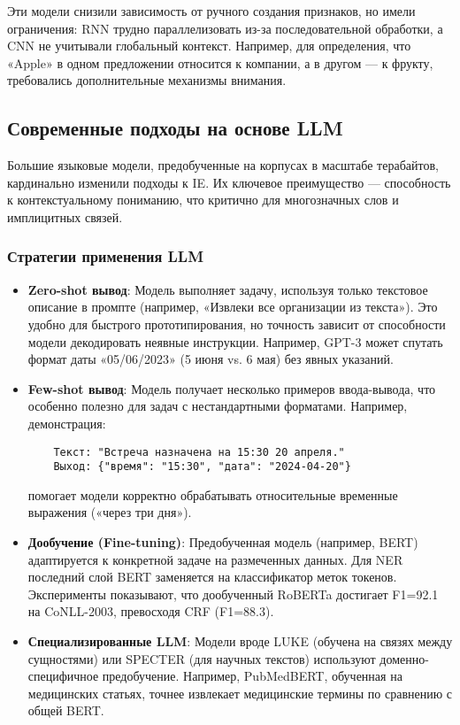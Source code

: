 Эти модели снизили зависимость от ручного создания признаков, но имели ограничения: RNN трудно параллелизовать из-за последовательной обработки, а CNN не учитывали глобальный контекст. Например, для определения, что «Apple» в одном предложении относится к компании, а в другом — к фрукту, требовались дополнительные механизмы внимания.

\subsection{Современные подходы на основе LLM}

Большие языковые модели, предобученные на корпусах в масштабе терабайтов, кардинально изменили подходы к IE. Их ключевое преимущество — способность к контекстуальному пониманию, что критично для многозначных слов и имплицитных связей.

\subsubsection{Стратегии применения LLM}

\begin{itemize}
    \item \textbf{Zero-shot вывод}: Модель выполняет задачу, используя только текстовое описание в промпте (например, «Извлеки все организации из текста»). Это удобно для быстрого прототипирования, но точность зависит от способности модели декодировать неявные инструкции. Например, GPT-3 может спутать формат даты «05/06/2023» (5 июня vs. 6 мая) без явных указаний.

    \item \textbf{Few-shot вывод}: Модель получает несколько примеров ввода-вывода, что особенно полезно для задач с нестандартными форматами. Например, демонстрация:
    \begin{verbatim}
    Текст: "Встреча назначена на 15:30 20 апреля."
    Выход: {"время": "15:30", "дата": "2024-04-20"}
    \end{verbatim}
    помогает модели корректно обрабатывать относительные временные выражения («через три дня»).

    \item \textbf{Дообучение (Fine-tuning)}: Предобученная модель (например, BERT) адаптируется к конкретной задаче на размеченных данных. Для NER последний слой BERT заменяется на классификатор меток токенов. Эксперименты показывают, что дообученный RoBERTa достигает F1=92.1 на CoNLL-2003, превосходя CRF (F1=88.3).

    \item \textbf{Специализированные LLM}: Модели вроде LUKE (обучена на связях между сущностями) или SPECTER (для научных текстов) используют доменно-специфичное предобучение. Например, PubMedBERT, обученная на медицинских статьях, точнее извлекает медицинские термины по сравнению с общей BERT.
\end{itemize}

